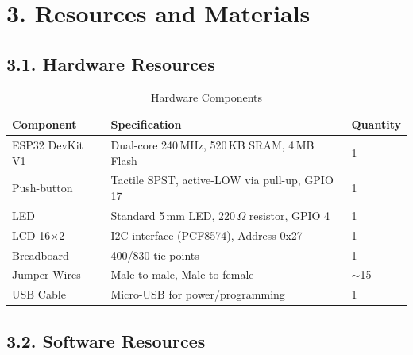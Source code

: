 \documentclass[12pt]{article}
\begin{document}
\section*{3. Resources and Materials}

\subsection*{3.1. Hardware Resources}

\begin{table}[H]
    \centering
    \caption{Hardware Components}
    \label{tab:hardware-resources}
    \begin{tabular}{|l|l|l|}
        \hline
        \textbf{Component} & \textbf{Specification} & \textbf{Quantity} \\
        \hline
        ESP32 DevKit V1 & Dual-core 240\,MHz, 520\,KB SRAM, 4\,MB Flash & 1 \\
        \hline
        Push-button & Tactile SPST, active-LOW via pull-up, GPIO 17 & 1 \\
        \hline
        LED & Standard 5\,mm LED, 220\,$\Omega$ resistor, GPIO 4 & 1 \\
        \hline
        LCD 16$\times$2 & I2C interface (PCF8574), Address 0x27 & 1 \\
        \hline
        Breadboard & 400/830 tie-points & 1 \\
        \hline
        Jumper Wires & Male-to-male, Male-to-female & $\sim$15 \\
        \hline
        USB Cable & Micro-USB for power/programming & 1 \\
        \hline
    \end{tabular}
\end{table}

\subsection*{3.2. Software Resources}
\end{document}
